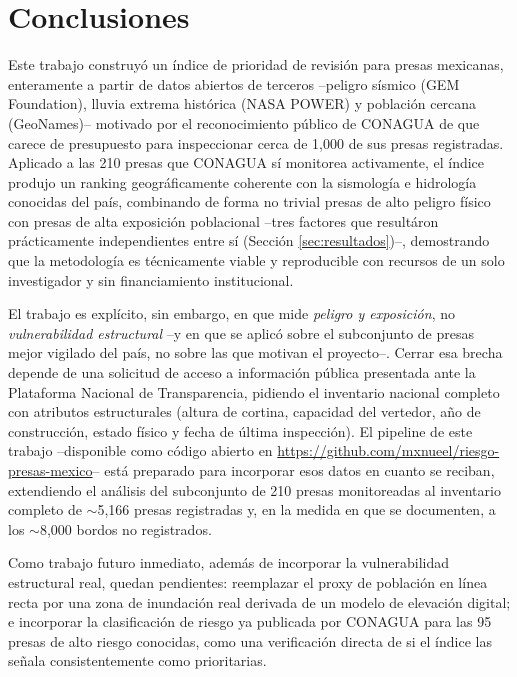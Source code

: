 \section{Conclusiones}
\label{sec:conclusiones}

Este trabajo construy\'o un \'indice de prioridad de revisi\'on para presas mexicanas, enteramente a partir de datos abiertos de terceros --peligro s\'ismico (GEM Foundation), lluvia extrema hist\'orica (NASA POWER) y poblaci\'on cercana (GeoNames)-- motivado por el reconocimiento p\'ublico de CONAGUA de que carece de presupuesto para inspeccionar cerca de 1{,}000 de sus presas registradas. Aplicado a las 210 presas que CONAGUA s\'i monitorea activamente, el \'indice produjo un ranking geogr\'aficamente coherente con la sismolog\'ia e hidrolog\'ia conocidas del pa\'is, combinando de forma no trivial presas de alto peligro f\'isico con presas de alta exposici\'on poblacional --tres factores que result\'aron pr\'acticamente independientes entre s\'i (Secci\'on \ref{sec:resultados})--, demostrando que la metodolog\'ia es t\'ecnicamente viable y reproducible con recursos de un solo investigador y sin financiamiento institucional.

El trabajo es expl\'icito, sin embargo, en que mide \emph{peligro y exposici\'on}, no \emph{vulnerabilidad estructural} --y en que se aplic\'o sobre el subconjunto de presas mejor vigilado del pa\'is, no sobre las que motivan el proyecto--. Cerrar esa brecha depende de una solicitud de acceso a informaci\'on p\'ublica presentada ante la Plataforma Nacional de Transparencia, pidiendo el inventario nacional completo con atributos estructurales (altura de cortina, capacidad del vertedor, a\~no de construcci\'on, estado f\'isico y fecha de \'ultima inspecci\'on). El pipeline de este trabajo --disponible como c\'odigo abierto en \url{https://github.com/mxnueel/riesgo-presas-mexico}-- est\'a preparado para incorporar esos datos en cuanto se reciban, extendiendo el an\'alisis del subconjunto de 210 presas monitoreadas al inventario completo de \(\sim\)5{,}166 presas registradas y, en la medida en que se documenten, a los \(\sim\)8{,}000 bordos no registrados.

Como trabajo futuro inmediato, adem\'as de incorporar la vulnerabilidad estructural real, quedan pendientes: reemplazar el proxy de poblaci\'on en l\'inea recta por una zona de inundaci\'on real derivada de un modelo de elevaci\'on digital; e incorporar la clasificaci\'on de riesgo ya publicada por CONAGUA para las 95 presas de alto riesgo conocidas, como una verificaci\'on directa de si el \'indice las se\~nala consistentemente como prioritarias.
